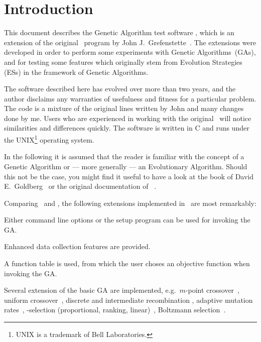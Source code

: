 %
%

\section{Introduction}\label{genesis-int}

This document describes the Genetic Algorithm test software \GEN, 
which is an extension of the original \Ogen\ program 
by John J.~Grefenstette~\cite{Gre87c}.
The extensions were developed in order to perform some experiments
with Genetic Algorithms~(GAs), and for testing some features which originally
stem from Evolution Strategies~\cite{Rec73,Schw81} (ESs) in the framework of
Genetic Algorithms.

The software described here has evolved over more than two years,
and the author disclaims any warranties of usefulness and fitness for
a particular problem. 
The code is a mixture of the original lines written by John and many
changes done by me.
Users who are experienced in working with the original \Ogen\
will notice similarities and differences quickly.
The software is written in C and runs under the 
UNIX\footnote{UNIX is a trademark of Bell Laboratories.} 
operating system.

In the following it is assumed that the reader is familiar with the
concept of a Genetic Algorithm or --- more generally --- an Evolutionary
Algorithm.
Should this not be the case, you might find it useful to have a look
at the book of David E.~Goldberg~\cite{Gol89b} or the original documentation
of \Ogen~\cite{Gre87c}.

Comparing \Ogen\ and \GEN, the following extensions implemented
in \GEN\ are most remarkably:
%
\begin{Itemize}
%
\item	Either command line options or the setup program can be used
	for invoking the GA.
%
\item	Enhanced data collection features are provided.
%
\item	A function table is used, from which the user choses an
	objective function when invoking the GA.
%
\item	Several extension of the basic GA are implemented, e.g.~$m$-point
	cross\-over~\cite{Jon75}, uniform crossover~\cite{Sys89},
	discrete and intermediate recombination \cite{BHS91}, adaptive
	mutation rates~\cite{Bae91b}, \cSelml-selection (proportional, ranking,
	linear)~\cite{BH91c}, Boltzmann selection~\cite{Gol90c}.
%
\end{Itemize}

